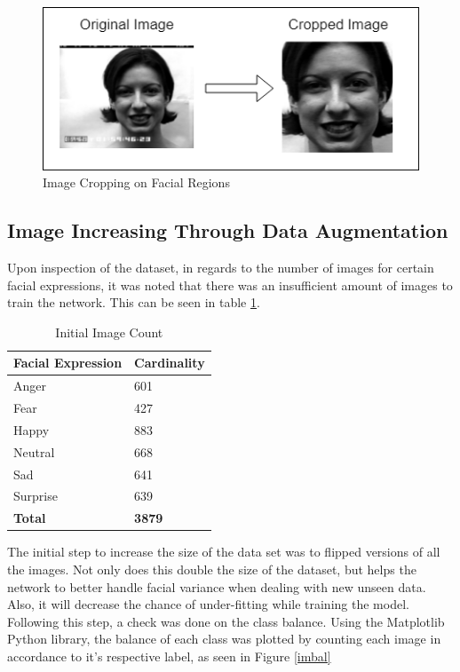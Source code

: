 \begin{figure}[ht]
	\begin{center}
		\advance\leftskip-3cm
		\advance\rightskip-3cm
		\includegraphics[keepaspectratio=true,scale=0.9]{__resources/DATASET/crop.png}
		\caption{Image Cropping on Facial Regions}
		\label{crop}
	\end{center}
\end{figure}
\newpage


\subsection{Image Increasing Through Data Augmentation}
Upon inspection of the dataset, in regards to the number of images for certain facial expressions, it was noted that there was an insufficient amount of images to train the network. This can be seen in table \ref{table: count}. 
\begin{table}
	\begin{tabular}{ |p{10cm}||p{3cm}|}
		\hline
		\textbf{Facial Expression} & \textbf{Cardinality}\\
		\hline
		\hline
		Anger & 601 \\
		\hline
		Fear & 427	\\
		\hline
		Happy & 883\\
		\hline
		Neutral & 668\\
		\hline
		Sad & 641	\\
		\hline
		Surprise  & 639	\\
		\hline
		\textbf{Total}  & \textbf{3879}	\\
		\hline
	\end{tabular}
	\caption{Initial Image Count}
	\label{table: count}
\end{table}

The initial step to increase the size of the data set was to flipped versions of all the images. Not only does this double the size of the dataset, but helps the network to better handle facial variance when dealing with new unseen data. Also, it will decrease the chance of under-fitting while training the model. Following this step, a check was done on the class balance. Using the Matplotlib Python library, the balance of each class was plotted by counting each image in accordance to it's respective label, as seen in Figure \ref{imbal}

